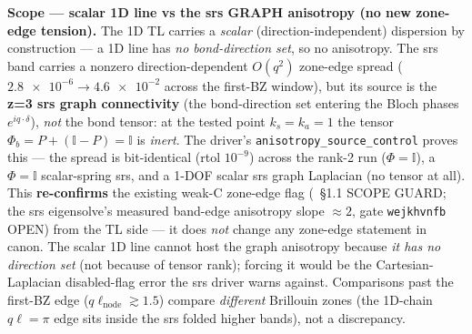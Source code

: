 \medskip\noindent\textbf{Scope --- scalar 1D line vs the srs GRAPH anisotropy (no new zone-edge tension).} The 1D TL carries a \emph{scalar} (direction-independent) dispersion by construction --- a 1D line has \emph{no bond-direction set}, so no anisotropy. The srs band carries a nonzero direction-dependent $O(q^2)$ zone-edge spread ($\num{2.8e-6}\to\num{4.6e-2}$ across the first-BZ window), but its source is the \textbf{z=3 srs graph connectivity} (the bond-direction set entering the Bloch phases $e^{iq\cdot\delta}$), \emph{not} the bond tensor: at the tested point $k_s=k_a=1$ the tensor $\Phi_b=P+(\mathbb{I}-P)=\mathbb{I}$ is \emph{inert}. The driver's \texttt{anisotropy\_source\_control} proves this --- the spread is bit-identical (rtol $10^{-9}$) across the rank-2 run ($\Phi=\mathbb{I}$), a $\Phi=\mathbb{I}$ scalar-spring srs, and a 1-DOF scalar srs graph Laplacian (no tensor at all). This \textbf{re-confirms} the existing weak-C zone-edge flag (~\S1.1 SCOPE GUARD; the srs eigensolve's measured band-edge anisotropy slope $\approx2$, gate \texttt{wejkhvnfb} OPEN) from the TL side --- it does \emph{not} change any zone-edge statement in canon. The scalar 1D line cannot host the graph anisotropy because \emph{it has no direction set} (not because of tensor rank); forcing it would be the Cartesian-Laplacian disabled-flag error the srs driver warns against. Comparisons past the first-BZ edge ($q\ell_{\mathrm{node}}\gtrsim1.5$) compare \emph{different} Brillouin zones (the 1D-chain $q\ell=\pi$ edge sits inside the srs folded higher bands), not a discrepancy.

